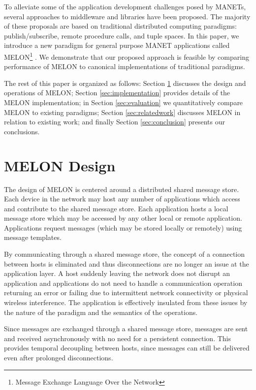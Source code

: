 \documentclass[lnicst]{svmultln}
\begin{document}
To alleviate some of the application development challenges posed by MANETs, several approaches to middleware and libraries have been proposed. The majority of these proposals are based on traditional distributed computing paradigms: publish/subscribe\cite{psfaces}, remote procedure calls\cite{rpc}, and tuple spaces\cite{linda}. In this paper, we introduce a new paradigm for general purpose MANET applications called MELON\footnote{Message Exchange Language Over the Network} . We demonstrate that our proposed approach is feasible by comparing performance of MELON to canonical implementations of traditional paradigms.

The rest of this paper is organized as follows: Section \ref{sec:design} discusses the design and operations of MELON; Section \ref{sec:implementation} provides details of the MELON implementation; in Section \ref{sec:evaluation} we quantitatively compare MELON to existing paradigms; Section \ref{sec:relatedwork} discusses MELON in relation to existing work; and finally Section \ref{sec:conclusion} presents our conclusions.

\section{MELON Design}\label{sec:design}

The design of MELON is centered around a distributed shared message store. Each device in the network may host any number of applications which access and contribute to the shared message store. Each application hosts a local message store which may be accessed by any other local or remote application. Applications request messages (which may be stored locally or remotely) using message templates.

By communicating through a shared message store, the concept of a connection between hosts is eliminated and thus disconnections are no longer an issue at the application layer. A host suddenly leaving the network does not disrupt an application and applications do not need to handle a communication operation returning an error or failing due to intermittent network connectivity or physical wireless interference. The application is effectively insulated from these issues by the nature of the paradigm and the semantics of the operations.

Since messages are exchanged through a shared message store, messages are sent and received asynchronously with no need for a persistent connection. This provides temporal decoupling between hosts, since messages can still be delivered even after prolonged disconnections.
\end{document}
